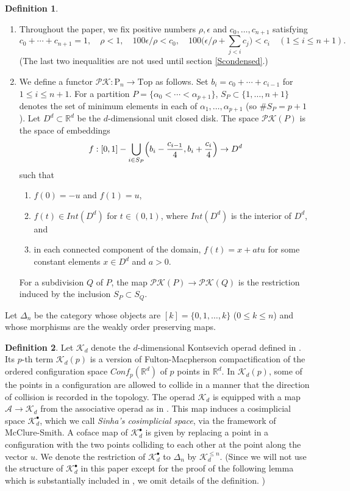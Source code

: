 \documentclass[reqno]{amsart}
\theoremstyle{definition}
\newtheorem{defi}{Definition}[section]
\theoremstyle{plain}
\newcommand{\eps}{\epsilon}
\newcommand{\PK}{\mathcal{PK}} %
\newcommand{\ASS}{\mathcal{A}}%
\newcommand{\KK}{\mathcal{K}}%
\newcommand{\CG}{\mathrm{Top}}%
\newcommand{\RR}{\mathbb{R}}
\newcommand{\PP}{\mathrm{P}} %
\begin{document}
\begin{defi}\label{DPK}
\begin{enumerate}
\item Throughout the paper, we fix positive numbers $\rho, \eps$ and $c_0,\dots, c_{n+1}$ satisfying 
\[
c_0+\cdots +c_{n+1}=1, \quad \rho<1,\quad 100\eps/\rho<c_0, \quad 100\bigl(\eps/\rho+\sum_{j<i}c_j\bigr)<c_i \quad (1\leq i\leq n+1).
\] (The last two inequalities are not used until section \ref{Scondensed}.)
\item We define a functor $\PK:\PP_n\to \CG$ as follows.
Set $b_i=c_0+\cdots +c_{i-1}$ for $1\leq i\leq n+1$. For a partition $P=\{\alpha_0<\cdots <\alpha_{p+1}\}$,  $S_P\subset \{1,\dots, n+1\}$ denotes the set of minimum elements in each of $\alpha_1,\dots, \alpha_{p+1}$ (so $\# S_P=p+1$).  Let $D^d\subset \RR^d$ be the $d$-dimensional unit closed disk. The space $\PK(P)$ is the space of embeddings 
\[
f:[0,1]-\bigcup_{i\in S_P} \Bigl(b_i-\frac{c_{i-1}}{4}, b_i+\frac{c_i}{4}\Bigr)\to D^d
\]   such that
\begin{enumerate}
\item $f(0)=-u$ and $f(1)=u$, 
\item $f(t)\in Int(D^d)$ for $t\in (0,1)$, where $Int(D^d)$ is the interior of $D^d$, and 
\item in each connected component of the domain, $f(t)=x+at u$ for some constant elements $x\in D^d$ and $a>0$. 
\end{enumerate}
For a subdivision $Q$ of $P$, the map $\PK(P)\to \PK(Q)$ is the  restriction induced by the inclusion $S_P\subset S_Q$.
\end{enumerate}
\end{defi}
Let $\Delta_n$ be the category whose objects are $[k]=\{0,1,\dots, k\}$ ($0\leq k\leq n$) and whose morphisms are the weakly order preserving maps. 
\begin{defi}\label{DKontsevich}
Let $\KK_d$ denote the $d$-dimensional Kontsevich operad defined in \cite{sinha1}. Its $p$-th term $\KK_d(p)$ is a version of Fulton-Macpherson compactification of the ordered configuration space $Conf_p(\RR^d)$ of $p$ points in $\RR^d$. In $\KK_d(p)$, some of the points in a configuration are allowed to collide in a manner that the direction of collision is recorded in the topology. The operad $\KK_d$ is equipped with a map $\ASS\to \KK_d$ from the associative operad as in \cite{sinha1}. This map induces a cosimplicial space $\KK_d^\bullet$, which we call {\em Sinha's cosimplicial space}, via the framework of McClure-Smith. A coface map of $\KK_d^\bullet$ is given by replacing a point in a configuration with the two points colliding to each other at the point along the vector $u$. We denote the restriction of $\KK^\bullet_d$  to $\Delta_n$ by $\KK^{\leq n}_d$. (Since we will not use  the structure of $\KK_d^\bullet$ in this paper except for the proof of the following lemma which is substantially included in \cite{sinha, sinha1}, we omit details of the definition. ) 
\end{defi}
\end{document}
